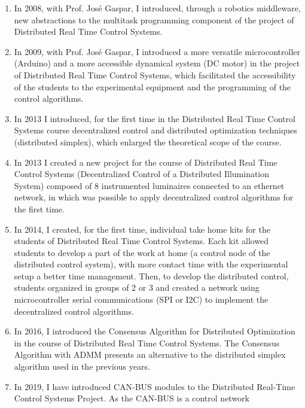 \begin{enumerate}
  of Modelling, Identification and Digital Control, for the control of a
  flexible bar. Also, I prepared with Prof. João Miranda Lemos a new
  project for the course on State-Space Control on designing optimal
  controllers and observers for the flexible bar kit.
\item
  In 2008, with Prof. José Gaspar, I introduced, through a robotics
  middleware, new abstractions to the multitask programming component of
  the project of Distributed Real Time Control Systems.
\item
  In 2009, with Prof. José Gaspar, I introduced a more versatile
  microcontroller (Arduino) and a more accessible dynamical system (DC
  motor) in the project of Distributed Real Time Control Systems, which
  facilitated the accessibility of the students to the experimental
  equipment and the programming of the control algorithms.
\item
  In 2013 I introduced, for the first time in the Distributed Real Time
  Control Systems course decentralized control and distributed
  optimization techniques (distributed simplex), which enlarged the
  theoretical scope of the course.
\item
  In 2013 I created a new project for the course of Distributed Real
  Time Control Systems (Decentralized Control of a Distributed
  Illumination System) composed of 8 instrumented luminaires connected
  to an ethernet network, in which was possible to apply decentralized
  control algorithms for the first time.
\item
  In 2014, I created, for the first time, individual take home kits for
  the students of Distributed Real Time Control Systems. Each kit
  allowed students to develop a part of the work at home (a control node
  of the distributed control system), with more contact time with the
  experimental setup a better time management. Then, to develop the
  distributed control, students organized in groups of 2 or 3 and
  created a network using microcontroller serial communications (SPI or
  I2C) to implement the decentralized control algorithms.
\item
  In 2016, I introduced the Consensus Algorithm for Distributed
  Optimization in the course of Distributed Real Time Control Systems.
  The Consensus Algorithm with ADMM presents an alternative to the
  distributed simplex algorithm used in the previous years.
\item
  In 2019, I have introduced CAN-BUS modules to the Distributed
  Real-Time Control Systems Project. As the CAN-BUS is a control network

\end{enumerate}
